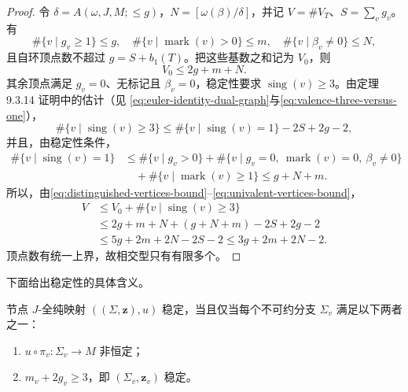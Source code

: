 \begin{proof}
令 $\delta=A(\omega,J,M;\le g)$，$N=[\omega(\beta)/\delta]$，并记
$V=\#V_T$、$S=\sum_vg_v$。有
\[
 \#\{v\mid g_v\ge1\}\le g,
 \quad \#\{v\mid\operatorname{mark}(v)>0\}\le m,
 \quad \#\{v\mid\beta_v\ne0\}\le N,
\]
且自环顶点数不超过 $g=S+b_1(T)$。把这些基数之和记为 $V_0$，则
\begin{equation}
 V_0\le2g+m+N.
 \label{eq:distinguished-vertices-bound}
\end{equation}
其余顶点满足 $g_v=0$、无标记且 $\beta_v=0$，稳定性要求
$\operatorname{sing}(v)\ge3$。由定理 9.3.14 证明中的估计（见
\eqref{eq:euler-identity-dual-graph}与\eqref{eq:valence-three-versus-one}），
\begin{equation}
 \#\{v\mid\operatorname{sing}(v)\ge3\}
 \le\#\{v\mid\operatorname{sing}(v)=1\}-2S+2g-2,
 \label{eq:trivalent-vertices-bound}
\end{equation}
并且，由稳定性条件，
\begin{equation}
 \begin{aligned}
  \#\{v\mid\operatorname{sing}(v)=1\}
  &\le\#\{v\mid g_v>0\}
    +\#\{v\mid g_v=0,\ \operatorname{mark}(v)=0,\ \beta_v\ne0\}\\
  &\quad+\#\{v\mid\operatorname{mark}(v)\ge1\}
  \le g+N+m.
 \end{aligned}
 \label{eq:univalent-vertices-bound}
\end{equation}
所以，由\eqref{eq:distinguished-vertices-bound}--\eqref{eq:univalent-vertices-bound}，
\[
 \begin{aligned}
  V&\le V_0+\#\{v\mid\operatorname{sing}(v)\ge3\}\\
  &\le 2g+m+N+(g+N+m)-2S+2g-2\\
  &\le 5g+2m+2N-2S-2\le 3g+2m+2N-2.
 \end{aligned}
\]
顶点数有统一上界，故相交型只有有限多个。
\end{proof}

下面给出稳定性的具体含义。

\begin{proposition}\label{prop:stability-componentwise-criterion}
节点 $J$-全纯映射 $((\Sigma,\boldsymbol z),u)$ 稳定，当且仅当每个不可约分支
$\Sigma_v$ 满足以下两者之一：
\begin{enumerate}[label=(\arabic*)]
 \item $u\circ\pi_v:\Sigma_v\to M$ 非恒定；
 \item $m_v+2g_v\ge3$，即 $(\Sigma_v,\boldsymbol z_v)$ 稳定。
\end{enumerate}
\end{proposition}


